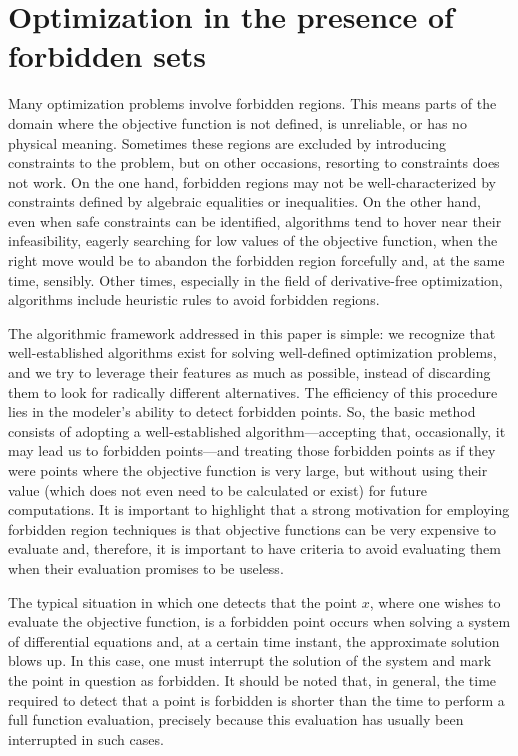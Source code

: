 \documentclass{article}
\begin{document}
\section{Optimization in the presence of forbidden sets} \label{forbid}

Many optimization problems involve forbidden regions. This means parts of the domain where the objective function is not defined,
 is unreliable, or has no physical meaning. Sometimes these regions are excluded by introducing constraints to the problem, 
but on other occasions, resorting to constraints does not work. On the one hand, forbidden regions may not be well-characterized by
 constraints defined by algebraic equalities or inequalities. On the other hand, even when safe constraints can be identified, 
algorithms tend to hover near their infeasibility, eagerly searching for low values of the objective function, when the right move
 would be to abandon the forbidden region forcefully and, at the same time, sensibly. Other times, especially in the field of 
derivative-free optimization, algorithms include heuristic rules to avoid forbidden regions.

The algorithmic framework addressed in this paper is simple: we recognize that well-established algorithms exist for
 solving well-defined optimization problems, and we try to leverage their features as much as possible, instead of 
discarding them to look for radically different alternatives. The efficiency of this procedure lies in the modeler's ability 
to detect forbidden points. So, the basic method consists of adopting a well-established 
algorithm—accepting that, occasionally, it may lead us to forbidden points—and treating those forbidden points as if 
they were points where the objective function is very large, but without using their value (which does not even need to be
 calculated or exist) for future computations. It is important to highlight that a strong motivation for employing 
forbidden region techniques is that objective functions can be very expensive to evaluate and, therefore, it is important 
to have criteria to avoid evaluating them
when their evaluation promises to be useless.

The typical situation in which one detects that the point $x$, where one wishes to evaluate the objective function,
 is a forbidden point occurs when solving a system of differential equations and, at a certain time instant, the approximate
 solution blows up. In this case, one must interrupt the solution of the system and mark the point in question as forbidden.
 It should be noted that, in general, the time required to detect that a point is forbidden is shorter than the time to 
perform a full function evaluation, precisely because this evaluation has usually been interrupted in such cases.
\end{document}

